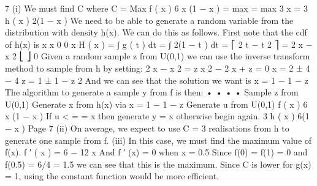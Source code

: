 \documentclass[a4paper,12pt]{article}
\begin{document}

7
(i)
We must find C where
C = Max
f ( x )
6 x (1 − x )
= max
= max 3 x = 3
h ( x )
2(1 − x )
We need to be able to generate a random variable from the distribution with
density h(x). We can do this as follows.
First note that the cdf of h(x) is
x x
0 0
x
H ( x ) = ∫ g ( t ) dt = ∫ 2(1 − t ) dt = ⎡ 2 t − t 2 ⎤ = 2 x − x 2
⎣
⎦ 0
Given a random sample z from U(0,1) we can use the inverse transform
method to sample from h by setting:
2 x − x 2 = z
x 2 − 2 x + z = 0
x =
2 ± 4 − 4 z
= 1 ± 1 − z
2
And we can see that the solution we want is x = 1 − 1 − z
The algorithm to generate a sample y from f is then:
•
•
•
•
Sample z from U(0,1)
Generate x from h(x) via x = 1 − 1 − z
Generate u from U(0,1)
f ( x ) 6 x (1 − x )
If u <
=
= x then generate y = x otherwise begin again.
3 h ( x ) 6(1 − x )
Page 7%
(ii) On average, we expect to use C = 3 realisations from h to generate one sample
from f.
(iii) In this case, we must find the maximum value of f(x).
f ′ ( x ) = 6 − 12 x
And f ′ (x) = 0 when x = 0.5
Since f(0) = f(1) = 0 and f(0.5) = 6/4 = 1.5 we can see that this is the
maximum.
Since C is lower for g(x) = 1, using the constant function would be more
efficient.
\end{document}
